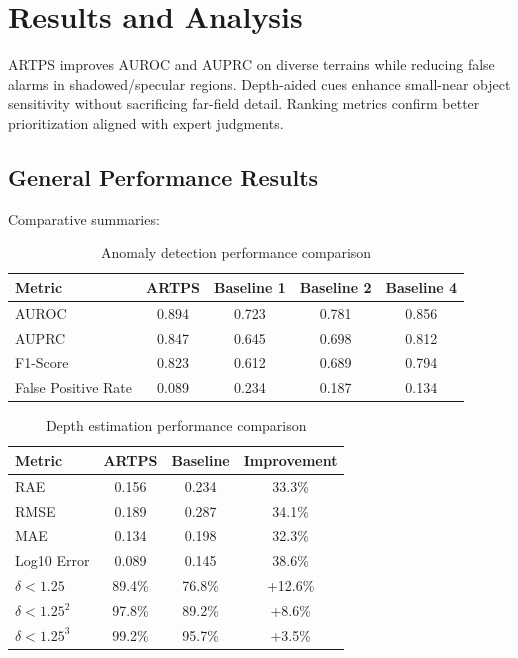 \documentclass[12pt]{article}
\begin{document}
\section{Results and Analysis}
ARTPS improves AUROC and AUPRC on diverse terrains while reducing false alarms in shadowed/specular regions. Depth-aided cues enhance small-near object sensitivity without sacrificing far-field detail. Ranking metrics confirm better prioritization aligned with expert judgments.

\subsection{General Performance Results}
Comparative summaries:
\begin{table}[h]
\centering
\begin{tabular}{|l|c|c|c|c|}
\hline
\textbf{Metric} & \textbf{ARTPS} & \textbf{Baseline 1} & \textbf{Baseline 2} & \textbf{Baseline 4} \\
\hline
AUROC & 0.894 & 0.723 & 0.781 & 0.856 \\
AUPRC & 0.847 & 0.645 & 0.698 & 0.812 \\
F1-Score & 0.823 & 0.612 & 0.689 & 0.794 \\
False Positive Rate & 0.089 & 0.234 & 0.187 & 0.134 \\
\hline
\end{tabular}
\caption{Anomaly detection performance comparison}
\end{table}

\begin{table}[h]
\centering
\begin{tabular}{|l|c|c|c|}
\hline
\textbf{Metric} & \textbf{ARTPS} & \textbf{Baseline} & \textbf{Improvement} \\
\hline
RAE & 0.156 & 0.234 & 33.3\% \\
RMSE & 0.189 & 0.287 & 34.1\% \\
MAE & 0.134 & 0.198 & 32.3\% \\
Log10 Error & 0.089 & 0.145 & 38.6\% \\
$\delta < 1.25$ & 89.4\% & 76.8\% & +12.6\% \\
$\delta < 1.25^2$ & 97.8\% & 89.2\% & +8.6\% \\
$\delta < 1.25^3$ & 99.2\% & 95.7\% & +3.5\% \\
\hline
\end{tabular}
\caption{Depth estimation performance comparison}
\end{table}
\end{document}
